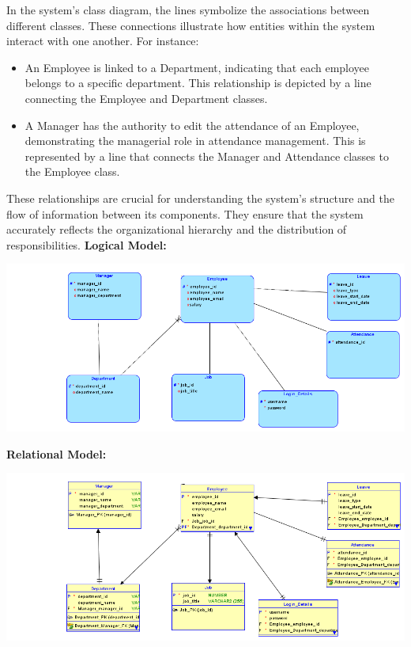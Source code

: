 \documentclass[a4paper, 12pt]{article}
\begin{document}
In the system’s class diagram, the lines symbolize the associations between different classes. These connections illustrate how entities within the system interact with one another. For instance:
\begin{itemize}
    \item An Employee is linked to a Department, indicating that each employee belongs to a specific department. This relationship is depicted by a line connecting the Employee and Department classes.
    \item A Manager has the authority to edit the attendance of an Employee, demonstrating the managerial role in attendance management. This is represented by a line that connects the Manager and Attendance classes to the Employee class.
\end{itemize}
These relationships are crucial for understanding the system’s structure and the flow of information between its components. They ensure that the system accurately reflects the organizational hierarchy and the distribution of responsibilities.
\textbf{Logical Model:}
\begin{center}
\includegraphics[width=1\textwidth]{Logical.png}\par
\end{center}
\textbf{Relational Model:}
\begin{center}
\includegraphics[width=1\textwidth]{Relational.png}\par
\end{center}
\end{document}
